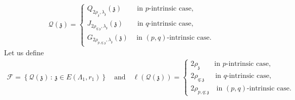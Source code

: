 \documentclass[11pt,oneside, english,reqno,twoside a4paper]{amsart}
\theoremstyle{definition}
\numberwithin{theorem}{section}
\numberwithin{equation}{section}
\begin{document}
\begin{align*}
\displaystyle
\mathcal{Q}(\mathfrak{z})=\left\{\begin{array}{l}
Q_{2\rho_\mathfrak{z},\lambda_\mathfrak{z}}(\mathfrak{z})\quad \,\,\,\,\,\,\,\text{in $p$-intrinsic case},\\
J_{2\rho_{q; \mathfrak{z}},\lambda_\mathfrak{z}}(\mathfrak{z})\quad \,\,\,\,\,\,\text{in $q$-intrinsic case},\\
G_{2\rho_{p, q;\mathfrak{z}},\lambda_\mathfrak{z}}(\mathfrak{z})\quad \,\text{in $(p, q)$-intrinsic case}.
\end{array}\right.
\end{align*}
Let us define
\begin{align*}
\mathcal{F}=\left\{\mathcal{Q}(\mathfrak{z})\, : \,\mathfrak{z}\in E(\Lambda_1,r_1)\right\}\quad \text{and} \quad \ell(\mathcal{Q}(\mathfrak{z}))=\left\{
    \begin{array}{l }
        2\rho_\mathfrak{z} \quad\,\,\,\,\,\, \text{in $p$-intrinsic case},\\
        2\rho_{q; \mathfrak{z}} \quad\,\,\, \text{in $q$-intrinsic case},\\
        2\rho_{p,q;\mathfrak{z}} \quad \text{in $(p,q)$-intrinsic case}.
    \end{array}
\right.
\end{align*} 
\end{document}
